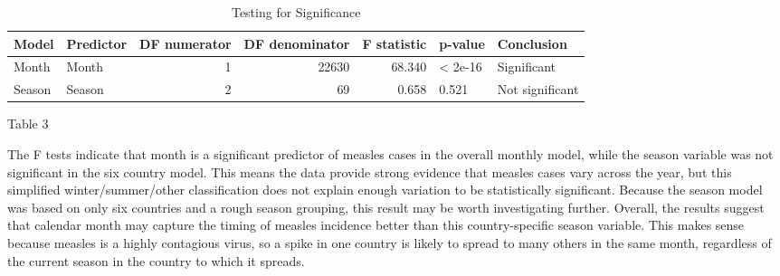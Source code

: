 \documentclass[
  letterpaper,
  DIV=11,
  numbers=noendperiod]{scrartcl}
\begin{document}
\begin{table}
\caption*{
{\fontsize{20}{25}\selectfont  Testing for Significance\fontsize{12}{15}\selectfont }
} 
\fontsize{12.0pt}{14.0pt}\selectfont
\begin{tabular*}{\linewidth}{@{\extracolsep{\fill}}llrrrll}
\toprule
Model & Predictor & DF numerator & DF denominator & F statistic & p-value & Conclusion \\ 
\midrule\addlinespace[2.5pt]
Month & Month & 1 & 22630 & 68.340 & < 2e-16 & Significant \\ 
Season & Season & 2 & 69 & 0.658 & 0.521 & Not significant \\ 
\bottomrule
\end{tabular*}
\end{table}

Table 3

The F tests indicate that month is a significant predictor of measles
cases in the overall monthly model, while the season variable was not
significant in the six country model. This means the data provide strong
evidence that measles cases vary across the year, but this simplified
winter/summer/other classification does not explain enough variation to
be statistically significant. Because the season model was based on only
six countries and a rough season grouping, this result may be worth
investigating further. Overall, the results suggest that calendar month
may capture the timing of measles incidence better than this
country-specific season variable. This makes sense because measles is a
highly contagious virus, so a spike in one country is likely to spread
to many others in the same month, regardless of the current season in
the country to which it spreads.
\end{document}
